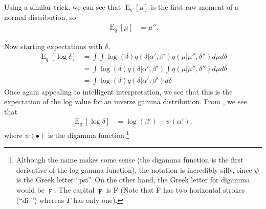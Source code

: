 \documentclass[12pt]{article}
\newcommand{\E}{\operatorname{E}}
\begin{document}
\begin{appendices}
Using a similar trick, we can see that $\E_{q}[\mu]$ is the first raw moment of
a normal distribution, so
\begin{align}
    \E_{q}[\mu] &= \mu''.
\end{align}

Now starting expectations with $\delta$,
\begin{align}
    \E_{q}[\log{\delta}] &= \int \int \log{(\delta)} q(\delta|\alpha', \beta')
    q(\mu|\mu'', \delta'') d\mu d\delta
    \nonumber \\
    &= \int \log{(\delta)} q(\delta|\alpha', \beta')
    \int q(\mu|\mu'', \delta'') d\mu d\delta
    \nonumber \\
    &= \int \log{(\delta)} q(\delta|\alpha', \beta') d\delta
\end{align}
Once again appealing to intelligent interpretation, we see that this is the
expectation of the log value for an inverse gamma distribution.  From
\autocite{invgamma}, we see that
\begin{align}
    \E_{q}[\log{\delta}] &= \log{(\beta')} - \psi(\alpha'),
\end{align}
where $\psi(\bullet)$ is the digamma function.\footnote{Although the name makes
some sense (the digamma function is the first derivative of the log gamma
function), the notation is incredibly silly, since $\psi$ is the Greek letter
\enquote{psi}.  On the other hand, the Greek letter for digamma would be
$\digamma$.  The capital $\digamma$ is F (Note that F has two horizontal strokes
(\enquote{di-}) whereas $\Gamma$ has only one).}


\end{appendices}
\end{document}
